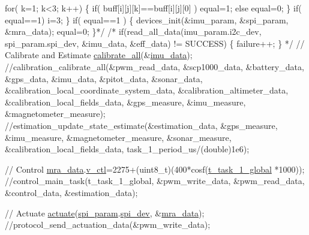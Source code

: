 \begin{DoxyCode}
{\textcolor{comment}{            for( k=1; k<3; k++)}
\textcolor{comment}{            \{}
\textcolor{comment}{              if( buff[i][j][k]==buff[i][j][0] )}
\textcolor{comment}{                equal=1;}
\textcolor{comment}{              else}
\textcolor{comment}{                equal=0;}
\textcolor{comment}{            \}}
\textcolor{comment}{          if( equal==1)}
\textcolor{comment}{            i=3;}
\textcolor{comment}{        \}}
\textcolor{comment}{        if( equal==1 )}
\textcolor{comment}{        \{}
\textcolor{comment}{          devices\_init(&imu\_param, &spi\_param, &mra\_data);}
\textcolor{comment}{          equal=0;}
\textcolor{comment}{        \}*/}
\textcolor{comment}{/*    if(read\_all\_data(imu\_param.i2c\_dev, spi\_param.spi\_dev, &imu\_data,
       &eff\_data) != SUCCESS)}
\textcolor{comment}{    \{}
\textcolor{comment}{        failure++;}
\textcolor{comment}{    \}}
\textcolor{comment}{*/}
    \textcolor{comment}{// Calibrate and Estimate}
    \hyperlink{calibration_2calibration_8c_a043045246cf217758281222214c4addc}{calibrate\_all}(&\hyperlink{main2_01_07C_xC3_xB3pia_01em_01conflito_01de_01Caio_01Gustavo_01Mesquita_01Angelo_012013-04-28_08_8c_a3cfea12cbe9ca7f1681c950e4cd68606}{imu\_data});
    \textcolor{comment}{//calibration\_calibrate\_all(&pwm\_read\_data, &scp1000\_data, &battery\_data,
       &gps\_data, &imu\_data, &pitot\_data, &sonar\_data,
       &calibration\_local\_coordinate\_system\_data, &calibration\_altimeter\_data, &calibration\_local\_fields\_data,
       &gps\_measure, &imu\_measure, &magnetometer\_measure);}
    \textcolor{comment}{//estimation\_update\_state\_estimate(&estimation\_data, &gps\_measure,
       &imu\_measure, &magnetometer\_measure, &sonar\_measure, &calibration\_local\_fields\_data,
       task\_1\_period\_us/(double)1e6);}

    \textcolor{comment}{// Control}
    \hyperlink{main2_01_07C_xC3_xB3pia_01em_01conflito_01de_01Caio_01Gustavo_01Mesquita_01Angelo_012013-04-28_08_8c_abc42e18d2909e9bc119316283f4ed9db}{mra\_data}.\hyperlink{structMRA__DATA__STRUCT_a64b4e6bb604e58de593a60c87942b966}{v\_ctl}=2275+(uint8\_t)(400*cosf(\hyperlink{main2_01_07C_xC3_xB3pia_01em_01conflito_01de_01Caio_01Gustavo_01Mesquita_01Angelo_012013-04-28_08_8c_a2a2a647912528f7aa86812528dbfe02f}{t\_task\_1\_global}
      *1000));
    \textcolor{comment}{//control\_main\_task(t\_task\_1\_global, &pwm\_write\_data, &pwm\_read\_data,
       &control\_data, &estimation\_data);}

    \textcolor{comment}{// Actuate}
    \hyperlink{communication_01_07C_xC3_xB3pia_01em_01conflito_01de_01Caio_01Gustavo_01Mesquita_01Angelo_012013-04-28_08_8c_a1d5f01d0124cff7030b5c4951b4bbefa}{actuate}(\hyperlink{main2_01_07C_xC3_xB3pia_01em_01conflito_01de_01Caio_01Gustavo_01Mesquita_01Angelo_012013-04-28_08_8c_adec2468b88cf50b20e5cf399a3b7e994}{spi\_param}.\hyperlink{structSPI__PARAM__STRUCT_abe385c44333d268d17cf648c8e371cad}{spi\_dev}, &\hyperlink{main2_01_07C_xC3_xB3pia_01em_01conflito_01de_01Caio_01Gustavo_01Mesquita_01Angelo_012013-04-28_08_8c_abc42e18d2909e9bc119316283f4ed9db}{mra\_data});
    \textcolor{comment}{//protocol\_send\_actuation\_data(&pwm\_write\_data);}

}
\end{DoxyCode}
